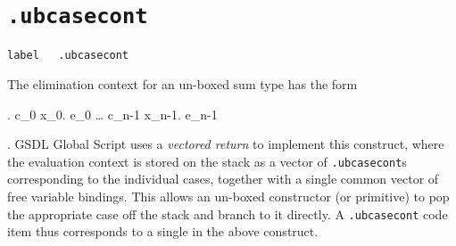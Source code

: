 \documentclass{report}
\newcommand\stringcode[1]{\texttt{#1}}
\begin{document}
\section{\stringcode{.ubcasecont}}

\begin{verbatim}
label	.ubcasecont
\end{verbatim}

The elimination context for an un-boxed sum type has the form
\begin{haskell}
     \bullet.  c_0 x_0. e_0 \ldots {} c_{n-1} x_{n-1}. e_{n-1}
\end{haskell}.
GSDL Global Script uses a \emph{vectored return}\cite{stg} to implement this construct,
where the evaluation context is stored on the stack as a vector of \stringcode{.ubcasecont}s corresponding to the individual cases,
together with a single common vector of free variable bindings.
This allows an un-boxed constructor (or primitive) to pop the appropriate case off the stack and branch to it directly.
A \stringcode{.ubcasecont} code item thus corresponds to a single \<\> in the above construct.
\end{document}
